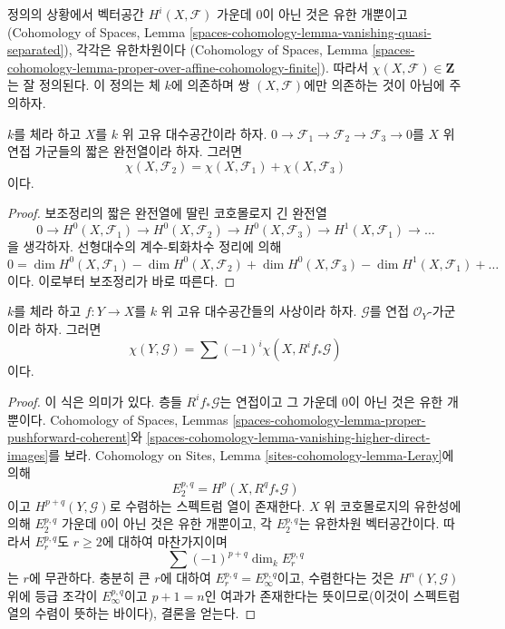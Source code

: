 \noindent
정의의 상황에서 벡터공간 $H^i(X, \mathcal{F})$ 가운데 0이 아닌 것은 유한
개뿐이고(Cohomology of Spaces, Lemma
\ref{spaces-cohomology-lemma-vanishing-quasi-separated}), 각각은 유한차원이다
(Cohomology of Spaces, Lemma
\ref{spaces-cohomology-lemma-proper-over-affine-cohomology-finite}). 따라서
$\chi(X, \mathcal{F}) \in \mathbf{Z}$는 잘 정의된다. 이 정의는 체 $k$에
의존하며 쌍 $(X, \mathcal{F})$에만 의존하는 것이 아님에 주의하자.

\begin{lemma}
\label{lemma-euler-characteristic-additive}
$k$를 체라 하고 $X$를 $k$ 위 고유 대수공간이라 하자.
$0 \to \mathcal{F}_1 \to \mathcal{F}_2 \to \mathcal{F}_3 \to 0$를 $X$ 위
연접 가군들의 짧은 완전열이라 하자. 그러면
$$
\chi(X, \mathcal{F}_2) = \chi(X, \mathcal{F}_1) + \chi(X, \mathcal{F}_3)
$$
이다.
\end{lemma}

\begin{proof}
보조정리의 짧은 완전열에 딸린 코호몰로지 긴 완전열
$$
0 \to H^0(X, \mathcal{F}_1) \to H^0(X, \mathcal{F}_2) \to
H^0(X, \mathcal{F}_3) \to H^1(X, \mathcal{F}_1) \to \ldots
$$
을 생각하자. 선형대수의 계수-퇴화차수 정리에 의해
$$
0 = \dim H^0(X, \mathcal{F}_1) - \dim H^0(X, \mathcal{F}_2)
+ \dim H^0(X, \mathcal{F}_3) - \dim H^1(X, \mathcal{F}_1) + \ldots
$$
이다. 이로부터 보조정리가 바로 따른다.
\end{proof}

\begin{lemma}
\label{lemma-euler-characteristic-morphism}
$k$를 체라 하고 $f : Y \to X$를 $k$ 위 고유 대수공간들의 사상이라 하자.
$\mathcal{G}$를 연접 $\mathcal{O}_Y$-가군이라 하자. 그러면
$$
\chi(Y, \mathcal{G}) = \sum (-1)^i \chi(X, R^if_*\mathcal{G})
$$
이다.
\end{lemma}

\begin{proof}
이 식은 의미가 있다. 층들 $R^if_*\mathcal{G}$는 연접이고 그 가운데 0이 아닌
것은 유한 개뿐이다. Cohomology of Spaces, Lemmas
\ref{spaces-cohomology-lemma-proper-pushforward-coherent}와
\ref{spaces-cohomology-lemma-vanishing-higher-direct-images}를 보라.
Cohomology on Sites, Lemma \ref{sites-cohomology-lemma-Leray}에 의해
$$
E_2^{p, q} = H^p(X, R^qf_*\mathcal{G})
$$
이고 $H^{p + q}(Y, \mathcal{G})$로 수렴하는 스펙트럼 열이 존재한다. $X$ 위
코호몰로지의 유한성에 의해 $E_2^{p, q}$ 가운데 0이 아닌 것은 유한 개뿐이고,
각 $E_2^{p, q}$는 유한차원 벡터공간이다. 따라서 $E_r^{p, q}$도
$r \geq 2$에 대하여 마찬가지이며
$$
\sum (-1)^{p + q} \dim_k E_r^{p, q}
$$
는 $r$에 무관하다. 충분히 큰 $r$에 대하여
$E_r^{p, q} = E_\infty^{p, q}$이고, 수렴한다는 것은
$H^n(Y, \mathcal{G})$ 위에 등급 조각이 $E_\infty^{p, q}$이고
$p + 1 = n$인 여과가 존재한다는 뜻이므로(이것이 스펙트럼 열의 수렴이
뜻하는 바이다), 결론을 얻는다.
\end{proof}








